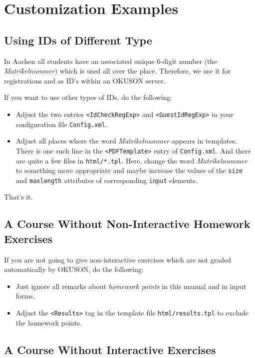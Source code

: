 \documentclass[12pt,openany,a4paper]{book}
\newcommand{\OKUSON}{\textsf{OKUSON}}
\begin{document}
\appendix
\chapter{Customization Examples}
\section{Using IDs of Different Type}

In Aachen all students have an associated  unique 6-digit number 
(the \emph{Matrikelnummer}) which is used all over the place. 
Therefore, we use it for registrations and as ID's within an {\OKUSON}
server. 

If you want to use other types of IDs, do the following:

\begin{itemize}
\item Adjust the two entries \texttt{<IdCheckRegExp>} and
\texttt{<GuestIdRegExp>} in your configuration file \texttt{Config.xml}.
\item Adjust all places where the word \emph{Matrikelnummer} appears in
templates.  There is one such line in the \texttt{<PDFTemplate>} entry of
\texttt{Config.xml}. And there are quite a few files in \texttt{html/*.tpl}. 
Here, change the word \emph{Matrikelnummer} to something more appropriate
and maybe increase the values of the \texttt{size} and \texttt{maxlength} 
attributes of corresponding \texttt{input} elements.
\end{itemize}

That's it.

\section{A Course Without Non-Interactive Homework Exercises}

If you are not going to give non-interactive exercises which are not graded
automatically by {\OKUSON}, do the following:

\begin{itemize}
\item Just ignore all remarks about \emph{homework points} in this manual 
and in input forms. 
\item Adjust the \texttt{<Results>} tag in the template file
\texttt{html/results.tpl} to exclude the homework points.
\end{itemize}

\section{A Course Without Interactive Exercises}
\end{document}

